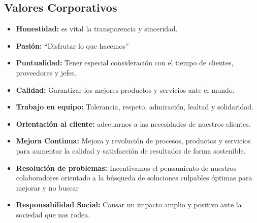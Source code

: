 \subsection{Valores Corporativos}
\begin{itemize}
  \item \textbf{Honestidad:}  es vital la transparencia y sinceridad.
  \item \textbf{Pasión:} ``Disfrutar lo que hacemos''
  \item \textbf{Puntualidad:} Tener especial consideración con el tiempo de clientes, proveedores y jefes.
  \item \textbf{Calidad:} Garantizar los mejores productos y servicios ante el mundo.
  \item \textbf{Trabajo en equipo:} Tolerancia, respeto, admiración, lealtad y solidaridad.
  \item \textbf{Orientación al cliente:} adecuarnos a las necesidades de nuestros clientes.
  \item \textbf{Mejora Continua:} Mejora y revolución de procesos, productos y servicios para aumentar la calidad y satisfacción de resultados de forma sostenible.
  \item \textbf{Resolución de problemas:} Incentivamos el pensamiento de nuestros colaboradores orientado a la búsqueda de soluciones culpables óptimas para mejorar y no buscar
  \item \textbf{Responsabilidad Social:} Causar un impacto amplio y positivo ante la sociedad que nos rodea.
\end{itemize}

